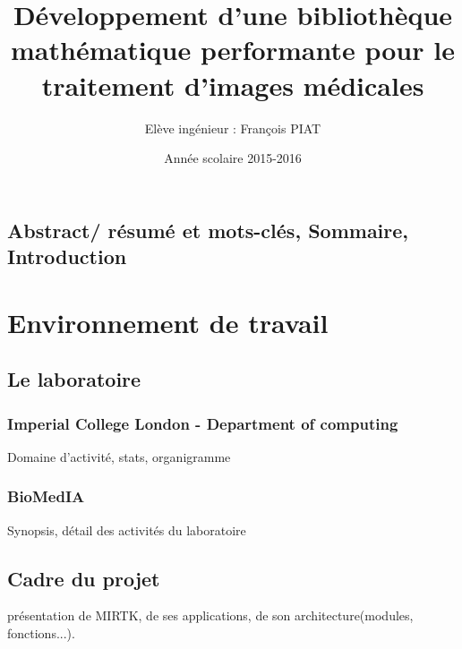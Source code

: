 \documentclass[12pt]{report}
\title{Développement d'une bibliothèque mathématique performante pour le traitement d'images médicales}
\author{Elève ingénieur : François PIAT}
\date{Année scolaire 2015-2016}
\begin{document}
	
\maketitle
\section*{Abstract/ résumé et mots-clés, Sommaire, Introduction} %

\chapter{Environnement de travail} 
	\section{Le laboratoire}
	\subsection{Imperial College London - Department of computing}
	Domaine d'activité, stats, organigramme
	\subsection{BioMedIA}
	Synopsis, détail des activités du laboratoire
	
%
%
%

	\section{Cadre du projet} présentation de MIRTK, de ses applications, de son architecture(modules, fonctions...).
\end{document}
